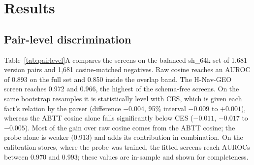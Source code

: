 \documentclass[11pt]{article}
\newcommand{\sub}[1]{\textsf{sh\_#1}}                    %
\newcommand{\geo}{H-Nav-GEO}
\begin{document}
\section{Results}
\label{sec:results}

\subsection{Pair-level discrimination}
\label{sec:pairlevel}

Table~\ref{tab:pairlevel}A compares the screens on the balanced \sub{64k} set of 1,681 version pairs and 1,681 cosine-matched negatives. Raw cosine reaches an AUROC of 0.893 on the full set and 0.850 inside the overlap band. The \geo{} screen reaches 0.972 and 0.966, the highest of the schema-free screens. On the same bootstrap resamples it is statistically level with CES, which is given each fact's relation by the parser (difference $-0.004$, 95\% interval $-0.009$ to $+0.001$), whereas the ABTT cosine alone falls significantly below CES ($-0.011$, $-0.017$ to $-0.005$). Most of the gain over raw cosine comes from the ABTT cosine; the probe alone is weaker (0.913) and adds its contribution in combination. On the calibration stores, where the probe was trained, the fitted screens reach AUROCs between 0.970 and 0.993; these values are in-sample and shown for completeness.
\end{document}
